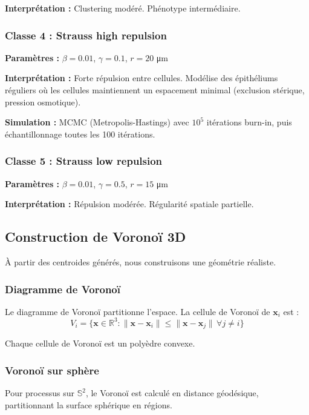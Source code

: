 \textbf{Interprétation :} Clustering modéré. Phénotype intermédiaire.

\subsubsection{Classe 4 : Strauss high repulsion}

\textbf{Paramètres :} $\beta = 0.01$, $\gamma = 0.1$, $r = 20$ μm

\textbf{Interprétation :} Forte répulsion entre cellules. Modélise des épithéliums réguliers où les cellules maintiennent un espacement minimal (exclusion stérique, pression osmotique).

\textbf{Simulation :}
MCMC (Metropolis-Hastings) avec $10^5$ itérations burn-in, puis échantillonnage toutes les 100 itérations.

\subsubsection{Classe 5 : Strauss low repulsion}

\textbf{Paramètres :} $\beta = 0.01$, $\gamma = 0.5$, $r = 15$ μm

\textbf{Interprétation :} Répulsion modérée. Régularité spatiale partielle.

\subsection{Construction de Voronoï 3D}

À partir des centroides générés, nous construisons une géométrie réaliste.

\subsubsection{Diagramme de Voronoï}

Le diagramme de Voronoï partitionne l'espace. La cellule de Voronoï de $\mathbf{x}_i$ est :
\[
V_i = \{\mathbf{x} \in \mathbb{R}^3 : \|\mathbf{x} - \mathbf{x}_i\| \leq \|\mathbf{x} - \mathbf{x}_j\| \, \forall j \neq i\}
\]

Chaque cellule de Voronoï est un polyèdre convexe.

\subsubsection{Voronoï sur sphère}

Pour processus sur $\mathbb{S}^2$, le Voronoï est calculé en distance géodésique, partitionnant la surface sphérique en régions.

